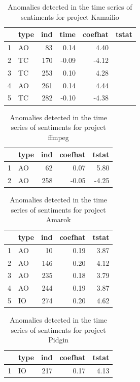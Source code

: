 \documentclass[12pt]{report}
\begin{document}
\begin{table}
\centering
\caption{Anomalies detected in the time series of sentiments for project Kamailio}
\label{TableDiversityMeasuresKunegisEtAl}
\begin{tabular}{rlrrrr}
  \hline
 & type & ind & time & coefhat & tstat \\ 
  \hline
1 & AO &  83 & 0.14 & 4.40 \\ 
  2 & TC & 170 & -0.09 & -4.12 \\ 
  3 & TC & 253 & 0.10 & 4.28 \\ 
  4 & AO & 261 & 0.14 & 4.44 \\ 
  5 & TC & 282 & -0.10 & -4.38 \\ 
   \hline
\end{tabular}
\end{table}


\begin{table}
\centering
\caption{Anomalies detected in the time series of sentiments for project ffmpeg}
\begin{tabular}{rlrrr}
  \hline
 & type & ind & coefhat & tstat \\ 
  \hline
1 & AO &  62 & 0.07 & 5.80 \\ 
  2 & AO & 258 & -0.05 & -4.25 \\ 
   \hline
\end{tabular}
\end{table}


\begin{table}
\centering
\caption{Anomalies detected in the time series of sentiments for project Amarok}
\begin{tabular}{rlrrr}
  \hline
 & type & ind & coefhat & tstat \\ 
  \hline
1 & AO &  10 & 0.19 & 3.87 \\ 
  2 & AO & 146 & 0.20 & 4.12 \\ 
  3 & AO & 235 & 0.18 & 3.79 \\ 
  4 & AO & 244 & 0.19 & 3.87 \\ 
  5 & IO & 274 & 0.20 & 4.62 \\ 
   \hline
\end{tabular}
\end{table}


\begin{table}
\centering
\caption{Anomalies detected in the time series of sentiments for project Pidgin}
\begin{tabular}{rlrrr}
  \hline
 & type & ind & coefhat & tstat \\ 
  \hline
1 & IO & 217 & 0.17 & 4.13 \\ 
   \hline
\end{tabular}
\end{table}
\end{document}
